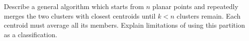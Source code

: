 Describe a general algorithm which starts from $n$ planar points and repeatedly merges the two clusters with closest centroids until $k<n$ clusters remain. Each centroid must average all its members. Explain limitations of using this partition as a classification.
